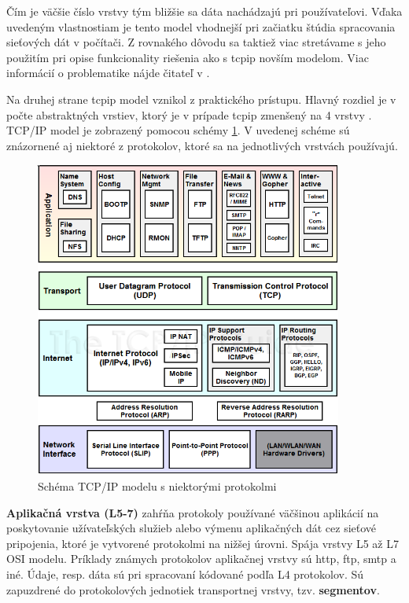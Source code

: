 Čím je väčšie číslo vrstvy tým bližšie sa dáta nachádzajú pri používateľovi. Vďaka uvedeným vlastnostiam je tento model vhodnejší pri začiatku štúdia spracovania sieťových dát v počítači. Z rovnakého dôvodu sa taktiež viac stretávame s jeho použitím pri opise funkcionality riešenia ako s  \acrshort{tcpip} novším modelom.  Viac informácií o problematike nájde čitateľ v \cite{osi}.

Na druhej strane \acrshort{tcpip} model vznikol z praktického prístupu. Hlavný rozdiel je v počte abstraktných vrstiev, ktorý je v prípade \acrshort{tcpip} zmenšený na 4 vrstvy \cite{tcpip}. 
TCP/IP model je zobrazený pomocou schémy \ref{tcpipprot}. V uvedenej schéme sú znázornené aj niektoré z protokolov, ktoré sa na jednotlivých vrstvách používajú.

\begin{figure}[!ht]
	\centering
	\includegraphics[width=0.9\textwidth]{figures/tcpipprot}
	\caption{Schéma TCP/IP modelu s niektorými protokolmi}
	\label{tcpipprot}
\end{figure}

\textbf{Aplikačná vrstva (L5-7)} zahŕňa protokoly používané väčšinou aplikácií na poskytovanie užívateľských služieb alebo výmenu aplikačných dát cez sieťové pripojenia, ktoré je vytvorené protokolmi na nižšej úrovni.  Spája vrstvy L5 až L7 OSI modelu. Príklady známych protokolov aplikačnej vrstvy sú \acrfull{http}, \acrfull{ftp}, \acrfull{smtp} a iné. Údaje, resp. dáta sú pri spracovaní kódované podľa L4 protokolov. Sú zapuzdrené do protokolových jednotiek transportnej vrstvy, tzv. \textbf{segmentov}.  

